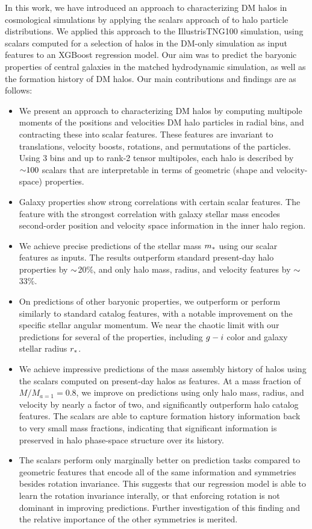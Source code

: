 In this work, we have introduced an approach to characterizing DM halos in cosmological simulations by applying the scalars approach of \cite{Villar2021a} to halo particle distributions.
We applied this approach to the IllustrisTNG100 simulation, using scalars computed for a selection of halos in the DM-only simulation as input features to an XGBoost regression model.
Our aim was to predict the baryonic properties of central galaxies in the matched hydrodynamic simulation, as well as the formation history of DM halos.
Our main contributions and findings are as follows:
\begin{itemize}
    \item We present an approach to characterizing DM halos by computing multipole moments of the positions and velocities DM halo particles in radial bins, and contracting these into scalar features. These features are invariant to translations, velocity boosts, rotations, and permutations of the particles. Using 3 bins and up to rank-2 tensor multipoles, each halo is described by $\mathord{\sim}100$ scalars that are interpretable in terms of geometric (shape and velocity-space) properties.
    \item Galaxy properties show strong correlations with certain scalar features. The feature with the strongest correlation with galaxy stellar mass encodes second-order position and velocity space information in the inner halo region.
    \item We achieve precise predictions of the stellar mass $m_*$ using our scalar features as inputs. The results outperform standard present-day halo properties by $\mathord{\sim}$20\%, and only halo mass, radius, and velocity features by $\mathord{\sim}$33\%.
    \item On predictions of other baryonic properties, we outperform or perform similarly to standard catalog features, with a notable improvement on the specific stellar angular momentum. We near the chaotic limit with our predictions for several of the properties, including $g-i$ color and galaxy stellar radius $r_*$.
    \item We achieve impressive predictions of the mass assembly history of halos using the scalars computed on present-day halos as features. At a mass fraction of $M/M_{a=1} = 0.8$, we improve on predictions using only halo mass, radius, and velocity by nearly a factor of two, and significantly outperform halo catalog features. The scalars are able to capture formation history information back to very small mass fractions, indicating that significant information is preserved in halo phase-space structure over its history. 
    \item The scalars perform only marginally better on prediction tasks compared to geometric features that encode all of the same information and symmetries besides rotation invariance. This suggests that our regression model is able to learn the rotation invariance interally, or that enforcing rotation is not dominant in improving predictions. Further investigation of this finding and the relative importance of the other symmetries is merited.
\end{itemize}



